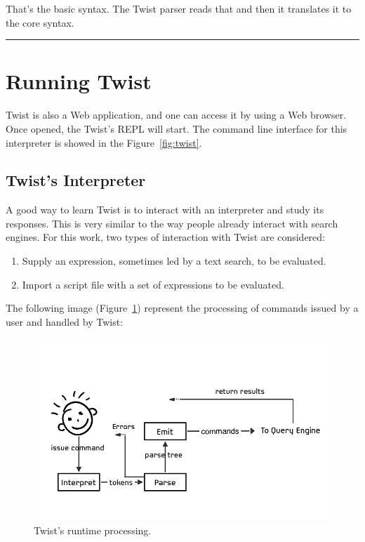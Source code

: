 That's the basic syntax. The Twist parser reads that and then it translates it to the core syntax.

\fancybreak{\pfbreakdisplay}

\section{Running Twist}
\label{sec:running}

Twist is also a Web application, and one can access it by using a Web browser. Once opened, the Twist's REPL will start. The command line interface for this interpreter is showed in the Figure~\ref{fig:twist}. 

\subsection{Twist's Interpreter}
\label{sec:interpreter}

A good way to learn Twist is to interact with an interpreter and study its responses. This is very similar to the way people already interact with search engines. For this work, two types of interaction with Twist are considered: 

\begin{enumerate}
	\item Supply an expression, sometimes led by a text search, to be evaluated.
	\item Import a script file with a set of expressions to be evaluated. 
\end{enumerate}	

The following image (Figure~\ref{fig:runtime}) represent the processing of commands issued by a user and handled by Twist:

\begin{figure}[!ht]
    \centering
    \includegraphics[width=\textwidth]{images/runtime}
    \caption{Twist's runtime processing.}
    \label{fig:runtime}
\end{figure} 

